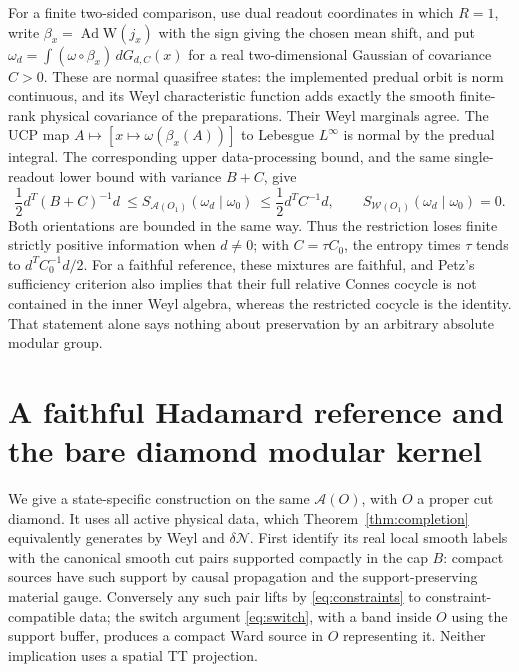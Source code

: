 \documentclass[11pt]{article}
\begin{document}
For a finite two-sided comparison, use dual readout coordinates in which \(R=1\), write \(\beta_x=\operatorname{Ad}\mathrm W(j_x)\) with the sign giving the chosen mean shift, and put \(\omega_d=\int(\omega\circ\beta_x)\,dG_{d,C}(x)\) for a real two-dimensional Gaussian of covariance \(C>0\). These are normal quasifree states: the implemented predual orbit is norm continuous, and its Weyl characteristic function adds exactly the smooth finite-rank physical covariance of the preparations. Their Weyl marginals agree. The UCP map \(A\mapsto[x\mapsto\omega(\beta_x(A))]\) to Lebesgue \(L^\infty\) is normal by the predual integral. The corresponding upper data-processing bound, and the same single-readout lower bound with variance \(B+C\), give
\begin{equation}
 \frac12 d^T(B+C)^{-1}d
 \ \le S_{\mathcal A(O_1)}(\omega_d\mid\omega_0)
 \ \le \frac12 d^TC^{-1}d,\qquad
 S_{\mathcal W(O_1)}(\omega_d\mid\omega_0)=0 .
 \label{eq:finite-entropy}
\end{equation}
Both orientations are bounded in the same way. Thus the restriction loses finite strictly positive information when \(d\ne0\); with \(C=\tau C_0\), the entropy times \(\tau\) tends to \(d^TC_0^{-1}d/2\). For a faithful reference, these mixtures are faithful, and Petz's sufficiency criterion \cite[Theorem 4]{petz} also implies that their full relative Connes cocycle is not contained in the inner Weyl algebra, whereas the restricted cocycle is the identity. That statement alone says nothing about preservation by an arbitrary absolute modular group.

\section{A faithful Hadamard reference and the bare diamond modular kernel}

We give a state-specific construction on the same \(\mathcal A(O)\), with \(O\) a proper cut diamond. It uses all active physical data, which Theorem~\ref{thm:completion} equivalently generates by Weyl and \(\delta\mathcal N\). First identify its real local smooth labels with the canonical smooth cut pairs supported compactly in the cap \(B\): compact sources have such support by causal propagation and the support-preserving material gauge. Conversely any such pair lifts by \eqref{eq:constraints} to constraint-compatible data; the switch argument \eqref{eq:switch}, with a band inside \(O\) using the support buffer, produces a compact Ward source in \(O\) representing it. Neither implication uses a spatial TT projection.
\end{document}
